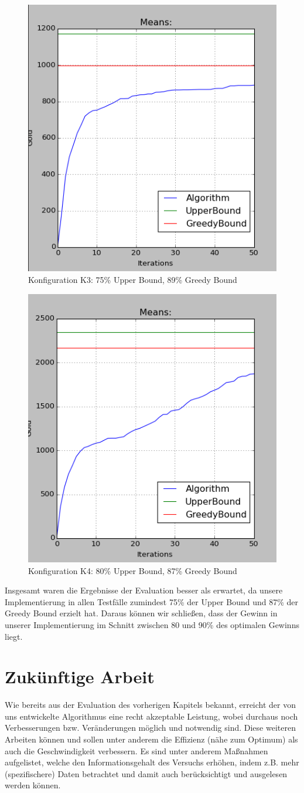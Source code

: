 \documentclass[fleqn,10pt]{SelfArx} %
\begin{document}
\label{fig:eval2}
\begin{figure}
  \centering
  \includegraphics[width=.4\textwidth]{10ad_15ag_50r_50it_cut.png}
  \caption{Konfiguration K3: 75\% Upper Bound, 89\% Greedy Bound}
\end{figure}
\label{fig:eval3}
\begin{figure}
  \centering
  \includegraphics[width=.4\textwidth]{20ad_15ag_50r_50it_cut.png}
  \caption{Konfiguration K4: 80\% Upper Bound, 87\% Greedy Bound}
\end{figure}
\label{fig:eval4}
Insgesamt waren die Ergebnisse der Evaluation besser als erwartet, da unsere Implementierung in allen Testfälle zumindest 75\% der Upper Bound und 87\% der Greedy Bound erzielt hat. Daraus können wir schließen, dass der Gewinn in unserer Implementierung im Schnitt zwischen 80 und 90\% des optimalen Gewinns liegt.
\section{Zukünftige Arbeit}
\label{sec:Future}

Wie bereits aus der Evaluation des vorherigen Kapitels bekannt, erreicht der von uns entwickelte Algorithmus eine recht akzeptable Leistung, wobei durchaus noch Verbesserungen bzw. Veränderungen möglich und notwendig sind. Diese weiteren Arbeiten können und sollen unter anderem die Effizienz (nähe zum Optimum) als auch die Geschwindigkeit verbessern. Es sind unter anderem Maßnahmen aufgelistet, welche den Informationsgehalt des Versuchs erhöhen, indem z.B. mehr (spezifischere) Daten betrachtet und damit auch berücksichtigt und ausgelesen werden können.
\end{document}
